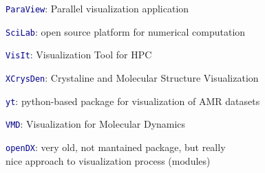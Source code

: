 \begin{frame}
\begin{small}
\begin{beamerboxesrounded}[upper=block head,lower=block body,shadow=true]{}
\textcolor{DarkRed}{} \textcolor{DarkBlue}{\tt ParaView}: %
        Parallel visualization application
\end{beamerboxesrounded}

\textcolor{DarkRed}{} \textcolor{DarkBlue}{\tt SciLab}: %
        open source platform for numerical computation

\begin{beamerboxesrounded}[upper=block head,lower=block body,shadow=true]{}
\textcolor{DarkRed}{} \textcolor{DarkBlue}{\tt VisIt}: %
        Visualization Tool for HPC
\end{beamerboxesrounded}

\textcolor{DarkRed}{} \textcolor{DarkBlue}{\tt XCrysDen}: %
        Crystaline and Molecular Structure Visualization

\vspace{1.15mm}
\textcolor{DarkRed}{} \textcolor{DarkBlue}{\tt yt}: %
        python-based package for visualization of AMR datasets

\vspace{1.15mm}
\textcolor{DarkRed}{} \textcolor{DarkBlue}{\tt VMD}: %
        Visualization for Molecular Dynamics

\textcolor{DarkRed}{} \textcolor{DarkBlue}{\tt openDX}: %
        very old, not mantained package, but really \\nice approach to visualization process (modules)
\end{small}
\end{frame}


